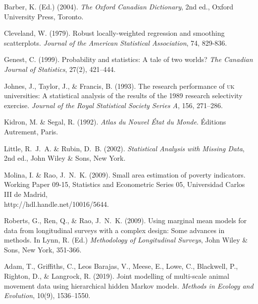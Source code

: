 
\begin{thebibliography}{}
Barber, K. (Ed.) (2004). {\it The Oxford Canadian Dictionary}, 2nd ed., 
Oxford University Press, Toronto.

Cleveland, W. (1979). Robust locally-weighted regression and smoothing scatterplots. 
{\it Journal of the American Statistical Association}, 74, 829-836.

Genest, C. (1999). Probability and statistics: A tale of two worlds? 
{\it The Canadian Journal of Statistics}, 27(2), 421--444.

Johnes, J., Taylor, J., \& Francis, B. (1993). The research
performance of \textsc{uk} universities: A statistical analysis of the results
of the 1989 research selectivity exercise. {\it Journal of the Royal
Statistical Society Series A}, 156, 271--286.

Kidron, M. \& Segal, R. (1992). {\it Atlas du Nouvel \'Etat
du Monde}. \'Editions Autrement, Paris.

Little, R.~J.~A. \& Rubin, D.~B. (2002). {\it Statistical Analysis with Missing Data}, 2nd ed., 
John Wiley \& Sons, New York.

Molina, I. \& Rao, J.~N.~K. (2009). Small area estimation of poverty indicators. Working Paper 09-15, Statistics and Econometric Series 05, Universidad Carlos III de Madrid, \\http://hdl.handle.net/10016/5644.

Roberts, G., Ren, Q., \& Rao, J.~N.~K. (2009). 
Using marginal mean models for data from longitudinal surveys
with a complex design: Some advances in methods. In Lynn, R. (Ed.) {\it Methodology of Longitudinal Surveys}, 
John Wiley \& Sons, New York, 351-366.



Adam, T., Griffiths, C., Leos Barajas, V., Meese, E., Lowe, C., Blackwell, P., Righton, D., \& Langrock, R. (2019).
Joint modelling of multi-scale animal movement data using hierarchical hidden Markov models.
{\it Methods in Ecology and Evolution}, 10(9), 1536–1550.


\end{thebibliography}
